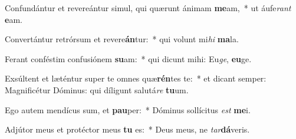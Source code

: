 \item Confundántur et revereántur simul, qui quærunt ánimam \textbf{me}am,~* ut áufe\textit{rant} \textbf{e}am.
\item Convertántur retrórsum et revere\textbf{án}tur:~* qui volunt mi\textit{hi} \textbf{ma}la.
\item Ferant conféstim confusiónem \textbf{su}am:~* qui dicunt mihi: Eu\textit{ge}, \textbf{eu}ge.
\item Exsúltent et læténtur super te omnes quæ\textbf{rén}tes te:~* et dicant semper: Magnificétur Dóminus: qui díligunt salutá\textit{re} \textbf{tu}um.
\item Ego autem mendícus sum, et \textbf{pau}per:~* Dóminus sollícitus \textit{est} \textbf{me}i.
\item Adjútor meus et protéctor meus \textbf{tu} es:~* Deus meus, ne \textit{tar}\textbf{dá}veris.

